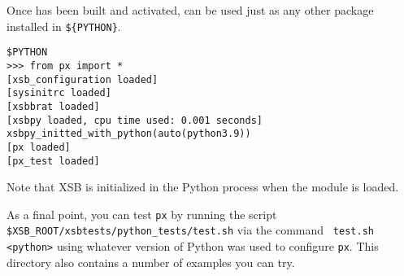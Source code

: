 Once \px{} has been built and activated, \px{} can be used just as any other package
installed in {\tt \$\{PYTHON\}}.

\begin{verbatim}
$PYTHON
>>> from px import *
[xsb_configuration loaded]
[sysinitrc loaded]
[xsbbrat loaded]
[xsbpy loaded, cpu time used: 0.001 seconds]
xsbpy_initted_with_python(auto(python3.9))
[px loaded]
[px_test loaded]
\end{verbatim}

\noindent
Note that XSB is initialized in the Python process when the \px{}
module is loaded.

As a final point, you can test {\tt px} by running the script {\tt
  \$XSB\_ROOT/xsbtests/python\_tests/test.sh} via the command {\tt
  test.sh <python>} using whatever version of Python was used to
configure {\tt px}.  This directory also contains a number of examples
you can try.






%



